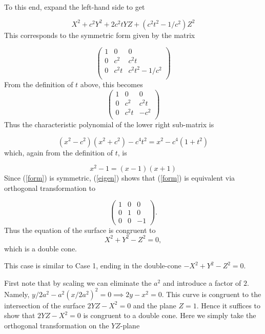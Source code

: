 \documentclass[12pt]{article}
\begin{document}
To this end, expand the left-hand side to get

$$X^2 + c^2 Y^2 + 2c^2t YZ + (c^2t^2 - 1/c^2 )Z^2$$
This corresponds to the symmetric form given by the matrix 

\begin{equation}\label{form}\left(
\begin{matrix} 
1 & 0 & 0 \\
0 & c^2 & c^2t \\
0 & c^2 t& c^2t^2 - 1/c^2 \\
\end{matrix}
\right)
\end{equation} 
From the definition of $t$ above, this becomes
$$\left(
\begin{matrix}
1 & 0 & 0 \\
0 & c^2 & c^2 t\\
0 & c^2 t& -c^2\\
\end{matrix}
\right)$$
Thus the characteristic polynomial of the lower right sub-matrix is

$$( x^2 - c^2)(x^2 + c^2) -  c^4 t^2 = x^2 - c^4(1 + t^2)$$
which, again from the definition of $t$, is

\begin{equation}\label{eigen} x^2  -1 = (x - 1)(x + 1)\end{equation}
Since (\ref{form}) is symmetric, (\ref{eigen}) shows that (\ref{form}) is
equivalent via orthogonal transformation to

$$\left(\begin{matrix}1 & 0 & 0 \\
0 & 1 & 0\\
0 & 0 & -1\end{matrix}\right).$$
Thus the equation of the surface is congruent to
$$X^2 + Y^2 - Z^2 = 0,$$
which is a double cone.

\medskip

 This case is similar to Case 1, ending in the
double-cone $-X^2 + Y^2 - Z^2 = 0$.

\medskip

 First note that by scaling 
we can eliminate the $a^2$ and introduce a factor of $2$.  Namely,
$y/2a^2 - a^2(x/2a^2)^2  = 0\implies 2y
- x^2 = 0$.  This curve is congruent to the intersection of
the surface $2YZ - X^2 = 0$ and the plane $Z = 1$.  Hence it suffices
to show that $2YZ - X^2 = 0$ is congruent to a double cone.  
Here we simply take the orthogonal transformation on the
$YZ$-plane
\end{document}
